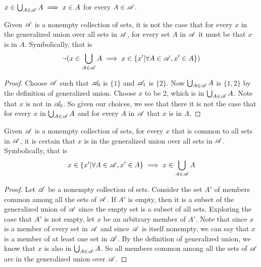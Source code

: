 \documentclass[main.tex]{subfiles}
\begin{document}
\subproblem{}\label{5b}

\(x \in \bigcup_{A \in \mathscr{A}} {A} \implies x \in A\) for every
\(A \in \mathscr{A}\).

\begin{thm}
	Given \(\mathscr{A}\) is a nonempty collection of sets, it is not the
	case that for every \(x\) in the generalized union over all sets in
	\(\mathscr{A}\), for every set \(A\) in \(\mathscr{A}\) it must be that
	\(x\) is in \(A\). Symbolically, that is
	\[\neg{} (x \in \bigcup\limits_{A \in \mathscr{A}} {A} \implies x \in \{x'|\forall A \in \mathscr{A}, x' \in A\})\]
\end{thm}
\begin{proof}
	Choose \(\mathscr{A}\) such that \(\mathscr{A}_0\) is \(\{1\}\) and
	\(\mathscr{A}_1\) is \(\{2\}\). Now \(\bigcup_{A \in \mathscr{A}} {A}\) is
	\(\{1,2\}\) by the definition of generalized union. Choose \(x\) to be
	2, which is in \(\bigcup_{A \in \mathscr{A}} {A}\). Note that \(x\) is not
	in \(\mathscr{A}_0\). So given our choices, we see that there it is not
	the case that for every \(x\) in \(\bigcup_{A \in \mathscr{A}} {A}\) and
	for every \(A\) in \(\mathscr{A}\) that \(x\) is in \(A\).
\end{proof}

\begin{thm}
	Given \(\mathscr{A}\) is a nonempty collection of sets, for every \(x\)
	that is common to all sets in \(\mathscr{A}\), it is certain that \(x\)
	is in the generalized union over all sets in \(\mathscr{A}\).
	Symbolically, that is
	\[x \in \{x'|\forall A \in \mathscr{A}, x' \in A\} \implies x \in \bigcup\limits_{A \in \mathscr{A}} {A}\]
\end{thm}
\begin{proof}
	Let \(\mathscr{A}\) be a nonempty collection of sets. Consider the set
	\(A'\) of members common among all the sets of \(\mathscr{A}\). If
	\(A'\) is empty, then it is a subset of the generalized union of
	\(\mathscr{A}\) since the empty set is a subset of all sets. Exploring
	the case that \(A'\) is not empty, let \(x\) be an arbitrary member of
	\(A'\). Note that since \(x\) is a member of every set in
	\(\mathscr{A}\) and since \(\mathscr{A}\) is itself nonempty, we can say
	that \(x\) is a member of at least one set in \(\mathscr{A}\). By the
	definition of generalized union, we know that \(x\) is also in
	\(\bigcup_{A \in \mathscr{A}} {A}\). So all members common among all the
	sets of \(\mathscr{A}\) are in the generalized union over
	\(\mathscr{A}\).
\end{proof}
\end{document}
